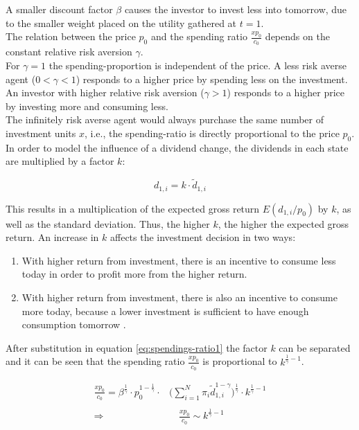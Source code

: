 \noindent A smaller discount factor $\beta$ causes the investor to invest less into tomorrow, due to the smaller weight placed on the utility gathered at $t=1$.\\

\noindent The relation between the price $p_0$ and the spending ratio $\frac{xp_0}{c_0}$ depends on the constant relative risk aversion $\gamma$.\\
For $\gamma = 1$ the spending-proportion is independent of the price. A less risk averse agent ($0 < \gamma < 1$) responds to a higher price by spending less on the investment. An investor with higher relative risk aversion ($\gamma > 1$) responds to a higher price by investing more and consuming less.\\
The infinitely risk averse agent would always purchase the same number of investment units $x$, i.e., the spending-ratio is directly proportional to the price $p_0$.\\

\noindent In order to model the influence of a dividend change, the dividends in each state are multiplied by a factor $k$:

\begin{equation*}
    d_{1,i} = k \cdot \tilde{d}_{1,i}
\end{equation*}

\bigskip

\noindent This results in a multiplication of the expected gross return $E(d_{1,i}/p_0)$ by $k$, as well as the standard deviation. Thus, the higher $k$, the higher the expected gross return. An increase in $k$ affects the investment decision in two ways:

\begin{enumerate}[label=(\alph*)]
    \item With higher return from investment, there is an incentive to consume less today in order to profit more from the higher return.
    \item With higher return from investment, there is also an incentive to consume more today, because a lower investment is sufficient to have enough consumption tomorrow \citep{dangl2021notes}.
\end{enumerate}

\noindent After substitution in equation \eqref{eq:spendings-ratio1} the factor $k$ can be separated and it can be seen that the spending ratio $\frac{xp_0}{c_0}$ is proportional to $k^{\frac{1}{\gamma}-1}$.

\begin{equation}
\begin{split}
    \frac{xp_0}{c_0} = \beta^{\frac{1}{\gamma}} \cdot p_0^{1- \frac{1}{\gamma}} \cdot & \bigg( \sum_{i=1}^{N} \pi_i \tilde{d}_{1,i}^{1-\gamma} \bigg) ^{\frac{1}{\gamma}} \cdot k^{\frac{1}{\gamma}-1}\\
    & \\
    \Rightarrow & \quad \frac{xp_0}{c_0} \sim k^{\frac{1}{\gamma}-1}
\end{split}
\end{equation}

